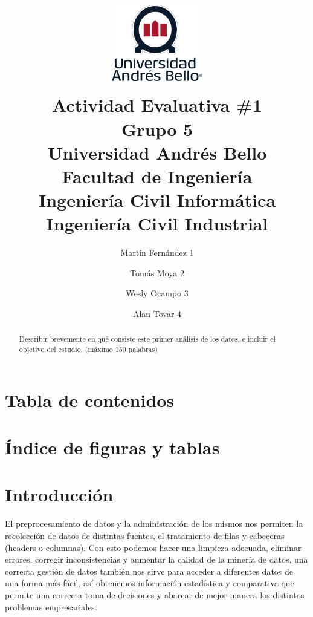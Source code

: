 \documentclass[]{elsarticle} %
\begin{document}
\begin{frontmatter}

  \title{\includegraphics[width=1.5625in,height=1.5625in]{logo_UNAB.png}\\
Actividad Evaluativa \#1\\
Grupo 5\\
Universidad Andrés Bello\\
Facultad de Ingeniería\\
Ingeniería Civil Informática\\
Ingeniería Civil Industrial}
    \author[]{Martín Fernández 1%
  }
    \author[]{Tomás Moya 2}
    \author[]{Wesly Ocampo 3%
  }
    \author[]{Alan Tovar 4%
  }
  
  \begin{abstract}
  Describir brevemente en qué consiste este primer análisis de los
  datos, e incluir el objetivo del estudio. (máximo 150 palabras)
  \end{abstract}
  
 \end{frontmatter}

\newpage

\section{Tabla de contenidos}
\section{Índice de figuras y tablas}

\newpage

\section{Introducción}

El preprocesamiento de datos y la administración de los mismos nos
permiten la recolección de datos de distintas fuentes, el tratamiento de
filas y cabeceras (headers o columnas). Con esto podemos hacer una
limpieza adecuada, eliminar errores, corregir inconsistencias y aumentar
la calidad de la minería de datos, una correcta gestión de datos también
nos sirve para acceder a diferentes datos de una forma más fácil, así
obtenemos información estadística y comparativa que permite una correcta
toma de decisiones y abarcar de mejor manera los distintos problemas
empresariales.
\end{document}
